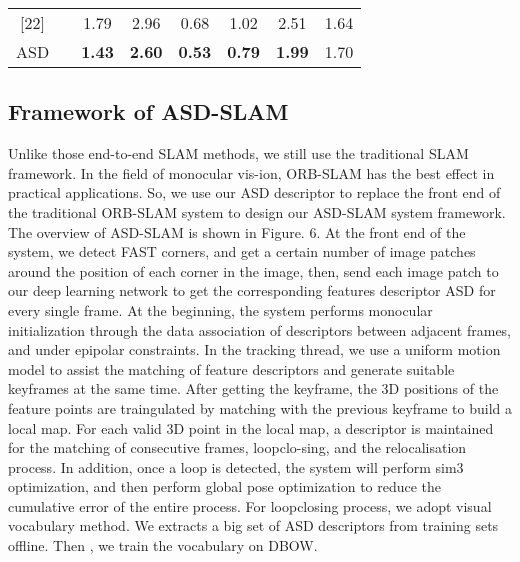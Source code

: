 \documentclass[letterpaper, 10 pt, conference]{ieeeconf}  %
\begin{document}
\begin{table}[h]
\begin{center}
\begin{tabular}{cccccccc}
  \cline{3-8}
\multirow{1}{*}{[22]}  & \multicolumn{1}{c}{}  & \multicolumn{1}{c}{1.79} & \multicolumn{1}{c}{2.96} & \multicolumn{1}{c}{0.68}  & \multicolumn{1}{c}{1.02}  & \multicolumn{1}{c}{2.51}  & \multicolumn{1}{c}{1.64}  \\
  \cline{3-8}
\multirow{1}{*}{ASD}  & \multicolumn{1}{c}{}  & \multicolumn{1}{c}{\textbf{1.43}} & \multicolumn{1}{c}{\textbf{2.60}} & \multicolumn{1}{c}{\textbf{0.53}}  & \multicolumn{1}{c}{\textbf{0.79}}  & \multicolumn{1}{c}{\textbf{1.99}}  & \multicolumn{1}{c}{1.70}  \\
\bottomrule
\hline
\hline
\toprule
\end{tabular} 
\end{center}
\end{table}
\subsection{Framework of ASD-SLAM}
Unlike those end-to-end SLAM methods, we still use the traditional SLAM framework. In the field of monocular vis-ion, ORB-SLAM has the best effect in practical applications. So, we use our ASD descriptor to replace the front end of the traditional ORB-SLAM system to design our ASD-SLAM system framework. The overview of ASD-SLAM is shown in Figure. 6.      At the front end of the system, we detect FAST corners, and get a certain number of image patches around the position of each corner in the image, then, send each image patch to our deep learning network to get the corresponding features descriptor ASD for every single frame. At the beginning, the system performs monocular initialization through the data association of descriptors between adjacent frames, and under epipolar constraints. In the tracking thread, we use a uniform motion model to assist the matching of feature descriptors and generate suitable keyframes at the same time. After getting the keyframe, the 3D positions of the feature points are traingulated by matching with the previous keyframe to build a local map. For each valid 3D point in the local map, a descriptor is maintained for the matching of consecutive frames, loopclo-sing, and the relocalisation process. In addition, once a loop is detected, the system will perform sim3 optimization, and then perform global pose optimization to reduce the cumulative error of the entire process.
 For loopclosing process, we adopt visual vocabulary method. We extracts a big set of ASD descriptors from training sets offline. Then , we train the vocabulary on DBOW.
\end{document}
